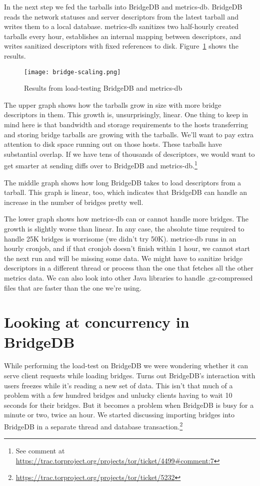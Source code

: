 \documentclass{article}
\begin{document}
In the next step we fed the tarballs into BridgeDB and metrics-db.
BridgeDB reads the network statuses and server descriptors from the latest
tarball and writes them to a local database.
metrics-db sanitizes two half-hourly created tarballs every hour,
establishes an internal mapping between descriptors, and writes sanitized
descriptors with fixed references to disk.
Figure~\ref{fig:bridgescaling} shows the results.

\begin{figure}[t]
\texttt{[image: bridge-scaling.png]}
\caption{Results from load-testing BridgeDB and metrics-db}
\label{fig:bridgescaling}
\end{figure}

The upper graph shows how the tarballs grow in size with more bridge
descriptors in them.
This growth is, unsurprisingly, linear.
One thing to keep in mind here is that bandwidth and storage requirements
to the hosts transferring and storing bridge tarballs are growing with the
tarballs.
We'll want to pay extra attention to disk space running out on those
hosts.
These tarballs have substantial overlap.
If we have tens of thousands of descriptors, we would want to get smarter
at sending diffs over to BridgeDB and metrics-db.\footnote{See comment at
\url{https://trac.torproject.org/projects/tor/ticket/4499#comment:7}}

The middle graph shows how long BridgeDB takes to load descriptors from a
tarball.
This graph is linear, too, which indicates that BridgeDB can handle an
increase in the number of bridges pretty well.

The lower graph shows how metrics-db can or cannot handle more bridges.
The growth is slightly worse than linear.
In any case, the absolute time required to handle 25K bridges is worrisome
(we didn't try 50K).
metrics-db runs in an hourly cronjob, and if that cronjob doesn't finish
within 1 hour, we cannot start the next run and will be missing some data.
We might have to sanitize bridge descriptors in a different thread or
process than the one that fetches all the other metrics data.
We can also look into other Java libraries to handle .gz-compressed files
that are faster than the one we're using.

\section{Looking at concurrency in BridgeDB}

While performing the load-test on BridgeDB we were wondering whether it
can serve client requests while loading bridges.
Turns out BridgeDB's interaction with users freezes while it's reading a
new set of data.
This isn't that much of a problem with a few hundred bridges and unlucky
clients having to wait 10 seconds for their bridges.
But it becomes a problem when BridgeDB is busy for a minute or two, twice
an hour.
We started discussing importing bridges into BridgeDB in a separate thread
and database transaction.\footnote{%
\url{https://trac.torproject.org/projects/tor/ticket/5232}}
\end{document}
